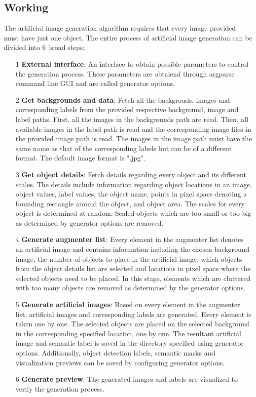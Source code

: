\documentclass[paper=a4,11pt,parskip=half,toc=listof]{scrartcl}
\begin{document}
\subsection{Working}
The artificial image generation algorithm requires that every image provided must have just one object. The entire process of artificial image generation can be divided into 6 broad steps:
	\begin{itemize}
		\item[1] \textbf{External interface}: An interface to obtain possible parameters to control the generation process. These parameters are obtaiend through argparse command line GUI and are called generator options.
		\item[2] \textbf{Get backgrounds and data}: Fetch all the backgrouds, images and corresponding labels from the provided respective background, image and label paths. First, all the images in the backgrounds path are read. Then, all available images in the label path is read and the corresponding image files in the provided image path is read. The images in the image path must have the same name as that of the corresponding labels but can be of a different format. The default image format is ".jpg".
		\item[3] \textbf{Get object details}: Fetch details regarding every object and its different scales. The details include information regarding object locations in an image, object values, label values, the object name, points in pixel space denoting a bounding rectangle around the object, and object area. The scales for every object is determined at random. Scaled objects which are too small or too big as determined by generator options are removed.
		\item[4] \textbf{Generate augmenter list}: Every element in the augmenter list denotes an artificial image and contains information including the chosen background image, the number of objects to place in the artificial image, which objects from the object details list are selected and locations in pixel space where the selected objects need to be placed. In this stage, elements which are cluttered with too many objects are removed as determined by the generator options.
		\item[5] \textbf{Generate artificial images}: Based on every element in the augmenter list, artificial images and corresponding labels are generated. Every element is taken one by one. The selected objects are placed on the selected background in the corresponding specified location, one by one. The resultant artificial image and semantic label is saved in the directory specified using generator options. Additionally, object detection labels, semantic masks and visualization previews can be saved by configuring generator options.
		\item[6] \textbf{Generate preview}: The generated images and labels are visualized to verify the generation process.
	\end{itemize}
		
\end{document}
